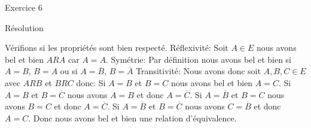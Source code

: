 \hypertarget{Exercice_6}{
\Huge{\begin{center}Exercice 6\end{center} \leavevmode\newline }}

\hypertarget{resolution}{%
\LARGE{Résolution}\label{resolution}}
\newline
\newline
Vérifions si les propriétés sont bien respecté.
\newline
\newline
Réflexivité: Soit $A \in E$ nous avons bel et bien $ARA$ car $A = A$.
\newline
Symétrie: Par définition nous avons bel et bien si $A=B$, $B=A$ ou si $A=\overline{B}$, $B=\overline{A}$
\newline
Transitivité:  Nous avons donc soit $A, B, C \in E$ avec $ARB$ et $BRC$ donc:
\newline
\newline
Si $A=B$ et $B=C$ nous avons bel et bien $A=C$.
\newline
Si $A=B$ et $B=\overline{C}$ nous avons $A=B$ et donc $A=\overline{C}$.
\newline
Si $A=\overline{B}$ et $B=C$ nous avons $B=C$ et donc $A=\overline{C}$.
\newline
Si $A=\overline{B}$ et $B=\overline{C}$ nous avons $C=\overline{B}$ et donc $A=C$.
\newline
\newline
Donc nous avons bel et bien une relation d'équivalence.
